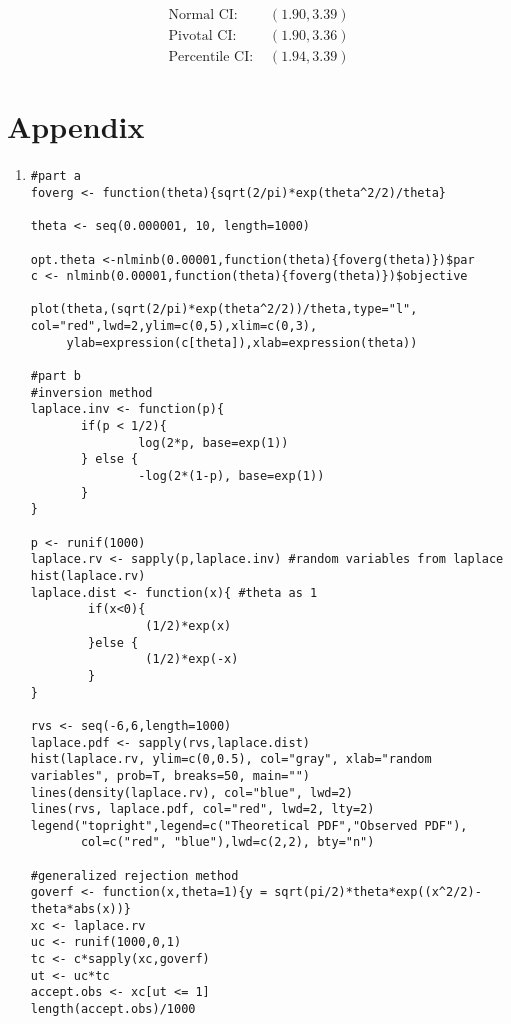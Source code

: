 \documentclass[letterpaper]{article}
\begin{document}
\begin{enumerate}
\begin{enumerate}
\begin{align*}
\text{Normal CI: }& (1.90,3.39)\\
\text{Pivotal CI: }& (1.90,3.36)\\
\text{Percentile CI: }& (1.94, 3.39)
\end{align*}

\end{enumerate}

\end{enumerate}
\newpage

\section{Appendix}
\begin{enumerate}
\item 
\begin{verbatim}
#part a
foverg <- function(theta){sqrt(2/pi)*exp(theta^2/2)/theta}

theta <- seq(0.000001, 10, length=1000)

opt.theta <-nlminb(0.00001,function(theta){foverg(theta)})$par
c <- nlminb(0.00001,function(theta){foverg(theta)})$objective

plot(theta,(sqrt(2/pi)*exp(theta^2/2))/theta,type="l", col="red",lwd=2,ylim=c(0,5),xlim=c(0,3), 
     ylab=expression(c[theta]),xlab=expression(theta))

#part b
#inversion method
laplace.inv <- function(p){
       if(p < 1/2){
               log(2*p, base=exp(1))
       } else {
               -log(2*(1-p), base=exp(1))
       }
}

p <- runif(1000)
laplace.rv <- sapply(p,laplace.inv) #random variables from laplace
hist(laplace.rv)
laplace.dist <- function(x){ #theta as 1
        if(x<0){
                (1/2)*exp(x)
        }else {
                (1/2)*exp(-x)
        }
}

rvs <- seq(-6,6,length=1000)
laplace.pdf <- sapply(rvs,laplace.dist)
hist(laplace.rv, ylim=c(0,0.5), col="gray", xlab="random variables", prob=T, breaks=50, main="")
lines(density(laplace.rv), col="blue", lwd=2)
lines(rvs, laplace.pdf, col="red", lwd=2, lty=2)
legend("topright",legend=c("Theoretical PDF","Observed PDF"),
       col=c("red", "blue"),lwd=c(2,2), bty="n")

#generalized rejection method
goverf <- function(x,theta=1){y = sqrt(pi/2)*theta*exp((x^2/2)-theta*abs(x))}
xc <- laplace.rv
uc <- runif(1000,0,1)
tc <- c*sapply(xc,goverf)
ut <- uc*tc
accept.obs <- xc[ut <= 1]
length(accept.obs)/1000


\end{verbatim}
\end{enumerate}
\end{document}
